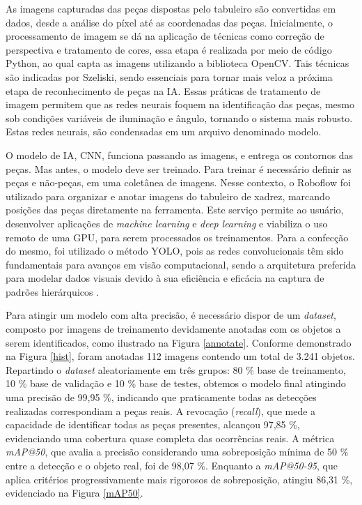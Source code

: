 \documentclass[journal]{IEEEtran} %
\begin{document}
As imagens capturadas das peças dispostas pelo tabuleiro são convertidas em dados, desde a análise do píxel até as coordenadas das peças. Inicialmente, o processamento de imagem se dá na aplicação de técnicas como correção de perspectiva e tratamento de cores, essa etapa é realizada por meio de código Python, ao qual capta as imagens utilizando a biblioteca OpenCV. Tais técnicas são indicadas por Szeliski, sendo essenciais para tornar mais veloz a próxima etapa de reconhecimento de peças na IA. Essas práticas de tratamento de imagem permitem que as redes neurais foquem na identificação das peças, mesmo sob condições variáveis de iluminação e ângulo, tornando o sistema mais robusto. Estas redes neurais, são condensadas em um arquivo denominado modelo.

O modelo de IA, CNN, funciona passando as imagens, e entrega os contornos das peças. Mas antes, o modelo deve ser treinado. Para treinar é necessário definir as peças e não-peças, em uma coletânea de imagens. Nesse contexto, o Roboflow foi utilizado para organizar e anotar imagens do tabuleiro de xadrez, marcando posições das peças diretamente na ferramenta. Este serviço permite ao usuário, desenvolver aplicações de \textit{machine learning} e \textit{deep learning} e viabiliza o uso remoto de uma GPU, para serem processados os treinamentos. Para a confecção do mesmo, foi utilizado o método YOLO, pois as redes convolucionais têm sido fundamentais para avanços em visão computacional, sendo a arquitetura preferida para modelar dados visuais devido à sua eficiência e eficácia na captura de padrões hierárquicos \cite{goodfellow2016}. 

Para atingir um modelo com alta precisão, é necessário dispor de um \textit{dataset}, composto por imagens de treinamento devidamente anotadas com os objetos a serem identificados, como ilustrado na Figura \ref{annotate}. Conforme demonstrado na Figura \ref{hist}, foram anotadas 112 imagens contendo um total de 3.241 objetos. Repartindo o \textit{dataset} aleatoriamente em três grupos: 80 \% base de treinamento, 10 \% base de validação e 10 \% base de testes, obtemos o modelo final atingindo uma precisão de 99,95 \%, indicando que praticamente todas as detecções realizadas correspondiam a peças reais. A revocação (\textit{recall}), que mede a capacidade de identificar todas as peças presentes, alcançou 97,85 \%, evidenciando uma cobertura quase completa das ocorrências reais. A métrica \textit{mAP@50}, que avalia a precisão considerando uma sobreposição mínima de 50 \% entre a detecção e o objeto real, foi de 98,07 \%. Enquanto a \textit{mAP@50-95}, que aplica critérios progressivamente mais rigorosos de sobreposição, atingiu 86,31 \%, evidenciado na Figura \ref{mAP50}.
\end{document}
